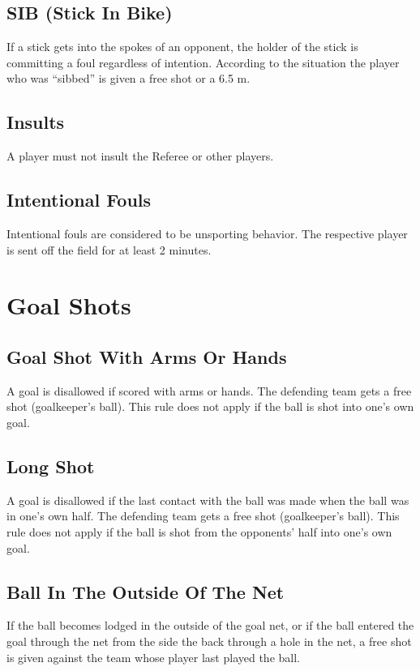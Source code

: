 \subsection{SIB (Stick In Bike)}
If a stick gets into the spokes of an opponent, the holder of the stick is committing a foul regardless of intention.
According to the situation the player who was ``sibbed'' is given a free shot or a 6.5 m.

\subsection{Insults}
A player must not insult the Referee or other players.

\subsection{Intentional Fouls \label{subsec:hockey_fouls_intentional-fouls}}
Intentional fouls are considered to be unsporting behavior.
The respective player is sent off the field for at least 2 minutes.

\section{Goal Shots}

\subsection{Goal Shot With Arms Or Hands \label{subsec:hockey_goal-shots_with-arms-or-hands}}
A goal is disallowed if scored with arms or hands.
The defending team gets a free shot (goalkeeper's ball).
This rule does not apply if the ball is shot into one's own goal.

\subsection{Long Shot}
A goal is disallowed if the last contact with the ball was made when the ball was in one's own half.
The defending team gets a free shot (goalkeeper's ball).
This rule does not apply if the ball is shot from the opponents' half into one's
own goal.

\subsection{Ball In The Outside Of The Net}
If the ball becomes lodged in the outside of the goal net, or if the ball entered the goal through the net from the side the back through a hole in the net, a free shot is given against the team whose player last played the ball.

